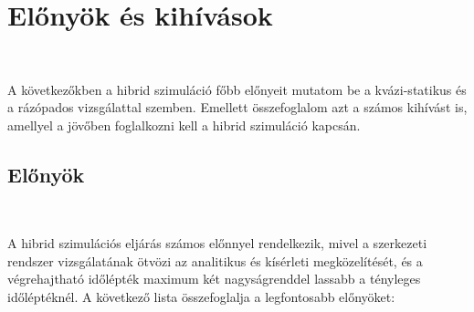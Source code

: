 \newpage
\section{Előnyök és kihívások}
{\ }

A következőkben  a hibrid szimuláció főbb előnyeit mutatom be a kvázi-statikus és a rázópados vizsgálattal szemben. Emellett összefoglalom  azt a számos kihívást is, amellyel a jövőben foglalkozni kell a hibrid szimuláció kapcsán.


\subsection{Előnyök}

{\ }

A hibrid szimulációs eljárás számos előnnyel rendelkezik, mivel  a szerkezeti rendszer vizsgálatának ötvözi az analitikus és  kísérleti megközelítését, és a végrehajtható időlépték  maximum két nagyságrenddel lassabb a tényleges időléptéknél. A következő lista összefoglalja a legfontosabb előnyöket:
